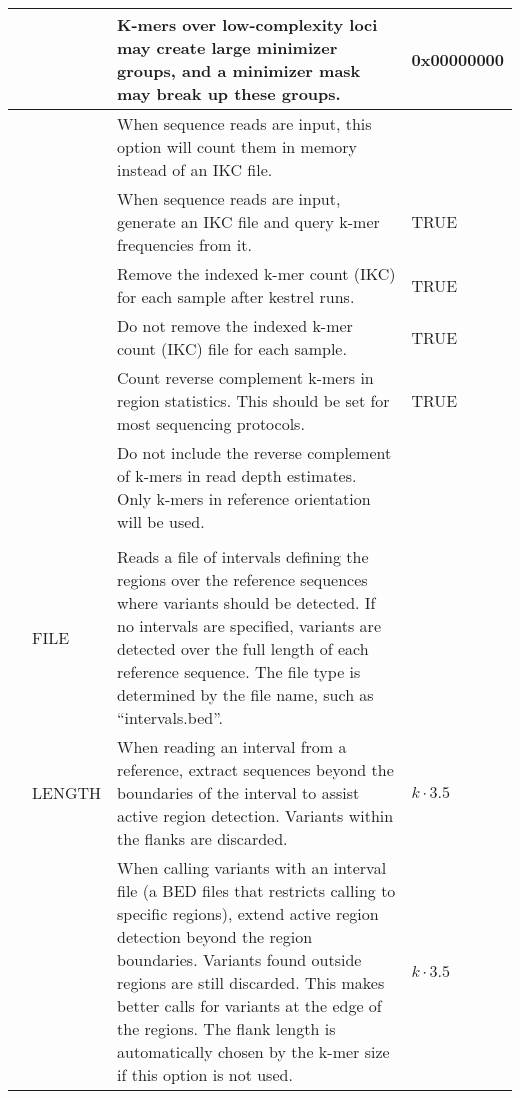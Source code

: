 \begin{small}
\begin{longtable}{|p{\optwidth}|p{\argwidth}|p{\dscwidth}|p{}|}
		\lopt{minmask} & &
		K-mers over low-complexity loci may create large minimizer groups, and a minimizer mask may break up these groups.
		& 0x00000000
		\\ \hline
		
		\lopt{memcount} & &
		When sequence reads are input, this option will count them in memory instead of an IKC file.
		&
		\\ \hline
		
		\lopt{nomemcount} & &
		When sequence reads are input, generate an IKC file and query k-mer frequencies from it.
		& TRUE
		\\ \hline
		
		\lopt{rmikc} & &
		Remove the indexed k-mer count (IKC) for each sample after kestrel runs.
		& TRUE
		\\ \hline
		
		\lopt{normikc} & &
		Do not remove the indexed k-mer count (IKC) file for each sample.
		& TRUE
		\\ \hline
		
		\lopt{countrev} & &
		Count reverse complement k-mers in region statistics. This should be set for most sequencing protocols.
		& TRUE
		\\ \hline
		
		\lopt{nocountrev} & &
		Do not include the reverse complement of k-mers in read depth estimates. Only k-mers in reference orientation will be used.
		&
		\\ \hline
		
		\optbox{\sopt{i}\\\lopt{interval}} & FILE &
		Reads a file of intervals defining the regions over the reference sequences where variants should be detected. If no intervals are specified, variants are detected over the full length of each reference sequence. The file type is determined by the file name, such as ``intervals.bed''.
		&
		\\ \hline
		
		\lopt{flank} & LENGTH &
		When reading an interval from a reference, extract sequences beyond the boundaries of the interval to assist active region detection. Variants within the flanks are discarded.
		&
		$k \cdot 3.5$
		\\ \hline
		
		\lopt{autoflank} & &
		When calling variants with an interval file (a BED files that restricts calling to specific regions), extend active region detection beyond the region boundaries. Variants found outside regions are still discarded. This makes better calls for variants at the edge of the regions. The flank length is automatically chosen by the k-mer size if this option is not used.
		& $k \cdot 3.5$
		\\ \hline
		

\end{longtable}
\end{small}
